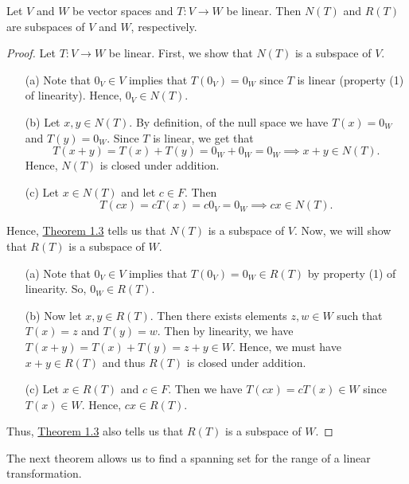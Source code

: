 \begin{theorem}
    Let \( V  \) and \( W  \) be vector spaces and \( T: V \to W  \) be linear. Then \( N(T) \) and \( R(T) \) are subspaces of \( V  \) and \( W  \), respectively.
\end{theorem}
\begin{proof}
    Let \( T: V \to W   \) be linear. First, we show that \( N(T) \) is a subspace of \( V  \). 
    \begin{enumerate}
        \item[(a)] Note that \( 0_{V} \in V  \) implies that \( T(0_{V}) = 0_{W}  \) since \( T  \) is linear (property (1) of linearity). Hence, \( 0_{V} \in N(T)  \).
        \item[(b)] Let \( x, y \in N(T) \). By definition, of the null space we have \( T(x) = 0_{W}  \) and \( T(y) = 0_{W} \). Since \( T  \) is linear, we get that
            \[  T(x+y) = T(x) + T(y) = 0_{W} + 0_{W} = 0_{W} \implies x + y \in N(T). \]
        Hence, \( N(T) \) is closed under addition.
        \item[(c)] Let \( x \in N(T)  \) and let \( c \in F  \). Then 
            \[ T(cx) = cT(x) = c 0_{V} = 0_{W} \implies cx \in N(T).  \]
    \end{enumerate}
    Hence, {\hyperref[Subspaces]{Theorem 1.3}} tells us that \( N(T) \) is a subspace of \( V  \).
    Now, we will show that \( R(T) \) is a subspace of \( W  \).
    \begin{enumerate}
        \item[(a)] Note that \( 0_{V} \in V  \) implies that \( T(0_{V}) = 0_{W} \in R(T) \) by property (1) of linearity. So, \( 0_{W} \in R(T) \).
        \item[(b)] Now let \( x,y \in R(T)  \). Then there exists elements \( z, w \in W   \) such that \( T(x) = z  \) and \( T(y) = w  \). Then by linearity, we have \( T(x+y) = T(x) + T(y) = z + y \in W   \). Hence, we must have \( x + y \in R(T) \) and thus \( R(T)  \) is closed under addition.
        \item[(c)] Let \( x \in R(T)  \) and \( c \in F \). Then we have \( T(cx) = c T(x) \in W  \) since \( T(x) \in W  \). Hence, \( cx \in R(T) \).
    \end{enumerate}
    Thus, {\hyperref[Subspaces]{Theorem 1.3}} also tells us that \( R(T)  \) is a subspace of \( W  \).
\end{proof}

The next theorem allows us to find a spanning set for the range of a linear transformation.

